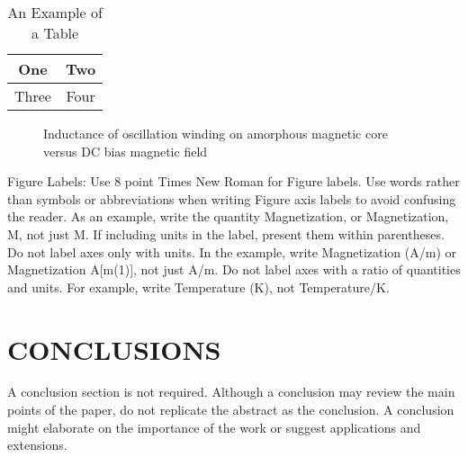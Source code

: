 \documentclass[letterpaper, 10pt, conference]{ieeeconf}   %
\begin{document}
\begin{CJK*}{UTF8}{bsmi}
\begin{table}[h]
\caption{An Example of a Table}
\label{table_example}
\begin{center}
\begin{tabular}{|c||c|}
\hline
One & Two\\
\hline
Three & Four\\
\hline
\end{tabular}
\end{center}
\end{table}


   \begin{figure}[thpb]
      \centering
      \caption{Inductance of oscillation winding on amorphous
       magnetic core versus DC bias magnetic field}
      \label{figurelabel}
   \end{figure}
   

Figure Labels: Use 8 point Times New Roman for Figure labels. Use words rather than symbols or abbreviations when writing Figure axis labels to avoid confusing the reader. As an example, write the quantity Magnetization, or Magnetization, M, not just M. If including units in the label, present them within parentheses. Do not label axes only with units. In the example, write Magnetization (A/m) or Magnetization {A[m(1)]}, not just A/m. Do not label axes with a ratio of quantities and units. For example, write Temperature (K), not Temperature/K.

\section{CONCLUSIONS}

A conclusion section is not required. Although a conclusion may review the main points of the paper, do not replicate the abstract as the conclusion. A conclusion might elaborate on the importance of the work or suggest applications and extensions. 

\addtolength{\textheight}{-12cm}  %


\end{CJK*}
\end{document}
